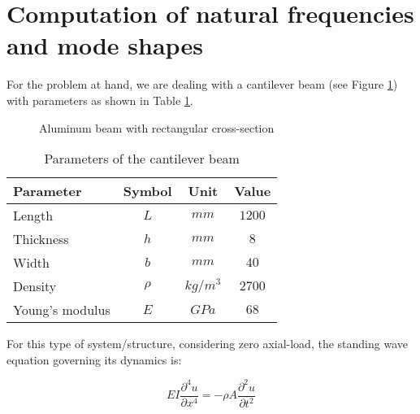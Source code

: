 \section{Computation of natural frequencies and mode shapes}
\label{sec:computation_of_natural_frequencies_and_mode_shapes}

For the problem at hand, we are dealing with a cantilever beam (see Figure \ref{fig:beam}) with parameters as shown in Table \ref{tab:beam_parameters}.

\begin{figure}[h]
    \centering
    \caption{Aluminum beam with rectangular cross-section}
    \label{fig:beam}
\end{figure}

\begin{table}[H]
    \centering
    \begin{tabular}{lccc}
        \hline
        Parameter       & Symbol & Unit     & Value  \\
        \hline
        Length          & $L$    & $mm$     & $1200$ \\
        Thickness       & $h$    & $mm$     & $8$    \\
        Width           & $b$    & $mm$     & $40$   \\
        Density         & $\rho$ & $kg/m^3$ & $2700$ \\
        Young's modulus & $E$    & $GPa$    & $68$   \\
        \hline
    \end{tabular}
    \caption{Parameters of the cantilever beam}
    \label{tab:beam_parameters}
\end{table}

For this type of system/structure, considering zero axial-load, the standing wave equation governing its dynamics is:

\begin{equation}
    E I \frac{\partial^4 u}{\partial x^4} = - \rho A \frac{\partial^2 u}{\partial t^2}
\end{equation}

